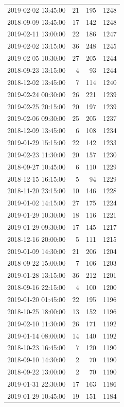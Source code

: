 \begin{tabular}{lrrr}
2019-02-02 13:45:00 & 21 & 195 & 1248 \\
2018-09-09 13:45:00 & 17 & 142 & 1248 \\
2019-02-11 13:00:00 & 22 & 186 & 1247 \\
2019-02-02 13:15:00 & 36 & 248 & 1245 \\
2019-02-05 10:30:00 & 27 & 205 & 1244 \\
2018-09-23 13:15:00 & 4 & 93 & 1244 \\
2018-12-02 13:45:00 & 7 & 114 & 1240 \\
2019-02-24 00:30:00 & 26 & 221 & 1239 \\
2019-02-25 20:15:00 & 20 & 197 & 1239 \\
2019-02-06 09:30:00 & 25 & 205 & 1237 \\
2018-12-09 13:45:00 & 6 & 108 & 1234 \\
2019-01-29 15:15:00 & 22 & 142 & 1233 \\
2019-02-23 11:30:00 & 20 & 157 & 1230 \\
2018-09-27 10:45:00 & 6 & 110 & 1229 \\
2018-12-15 16:15:00 & 5 & 94 & 1229 \\
2018-11-20 23:15:00 & 10 & 146 & 1228 \\
2019-01-02 14:15:00 & 27 & 175 & 1224 \\
2019-01-29 10:30:00 & 18 & 116 & 1221 \\
2019-01-29 09:30:00 & 17 & 145 & 1217 \\
2018-12-16 20:00:00 & 5 & 111 & 1215 \\
2019-01-09 14:30:00 & 21 & 206 & 1204 \\
2018-09-22 15:00:00 & 7 & 106 & 1203 \\
2019-01-28 13:15:00 & 36 & 212 & 1201 \\
2018-09-16 22:15:00 & 4 & 100 & 1200 \\
2019-01-20 01:45:00 & 22 & 195 & 1196 \\
2018-10-25 18:00:00 & 13 & 152 & 1196 \\
2019-02-10 11:30:00 & 26 & 171 & 1192 \\
2019-01-14 08:00:00 & 14 & 140 & 1192 \\
2018-10-23 16:45:00 & 7 & 120 & 1190 \\
2018-09-10 14:30:00 & 2 & 70 & 1190 \\
2018-09-22 13:00:00 & 2 & 70 & 1190 \\
2019-01-31 22:30:00 & 17 & 163 & 1186 \\
2019-01-29 10:45:00 & 19 & 151 & 1184 \\

\end{tabular}
